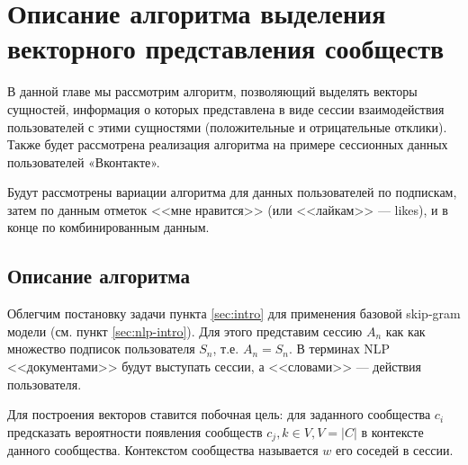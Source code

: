 \documentclass[times,specification,annotation]{itmo-student-thesis}
\begin{document}
\finishrelatedwork

\chapter{Описание алгоритма выделения векторного представления сообществ}

В данной главе мы рассмотрим алгоритм, позволяющий выделять векторы
сущностей, информация о которых представлена в виде сессии взаимодействия
пользователей с этими сущностями (положительные и отрицательные отклики).
Также будет рассмотрена реализация алгоритма на примере сессионных данных
пользователей «Вконтакте». 

Будут рассмотрены вариации алгоритма для данных пользователей по подпискам, затем по данным отметок <<мне нравится>> (или <<лайкам>> --- likes), и в конце по комбинированным данным.

\section{Описание алгоритма}\label{sec:algo}

Облегчим постановку задачи пункта \ref{sec:intro} для применения базовой skip-gram \cite{mikolov2013distributed} модели (см. пункт \ref{sec:nlp-intro}). Для этого представим сессию $A_n$ как как множество подписок пользователя $S_n$, т.е. $A_n = S_n$. В терминах NLP <<документами>> будут выступать сессии, а <<словами>> --- действия пользователя.

Для построения векторов ставится побочная цель: для заданного сообщества $c_i$ предсказать вероятности появления сообществ $c_j, k \in V, V = |C|$ в контексте данного сообщества. Контекстом сообщества называется $w$ его соседей в сессии. 
\end{document}
